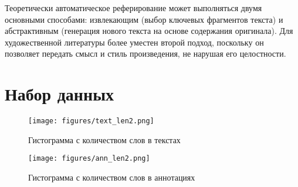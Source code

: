 \documentclass{article}
\theoremstyle{definition}
\theoremstyle{plain}
\begin{document}
Теоретически автоматическое реферирование может выполняться двумя основными способами: извлекающим (выбор ключевых фрагментов текста) и абстрактивным (генерация нового текста на основе содержания оригинала). Для художественной литературы более уместен второй подход, поскольку он позволяет передать смысл и стиль произведения, не нарушая его целостности.

\section*{Набор данных}
\begin{figure}[h!]
    \centering
    \begin{minipage}[t]{0.49\textwidth}
        \centering
        \texttt{[image: figures/text\_len2.png]}
        \caption{Гистограмма с количеством слов в текстах}
        \label{fig:text_len}
    \end{minipage}
    \hfill
    \begin{minipage}[t]{0.49\textwidth}
        \centering
        \texttt{[image: figures/ann\_len2.png]}
        \caption{Гистограмма с количеством слов в аннотациях}
        \label{fig:ann_len}
    \end{minipage}
\end{figure}
\end{document}
